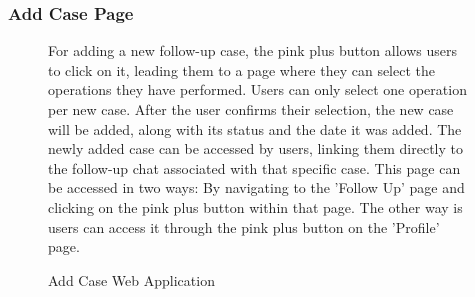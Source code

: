 \documentclass[12pt,oneside,openright,a4paper]{cpe-english-project}
\begin{document}
        \subsubsection{Add Case Page}
          \begin{figure}[!h]
            \centering
            \begin{minipage}{.5\textwidth}
              \centering
            \end{minipage}%
            \begin{minipage}{.5\textwidth}
              \centering
            \end{minipage}%
          
            \caption{Add Case Web Application}\label{fig:WebAppAddCase}
            \begin{flushleft}
              \qquad For adding a new follow-up case, the pink plus button allows users to click on it, leading them to a page where they can select the operations they have performed. Users can only select one operation per new case. After the user confirms their selection, the new case will be added, along with its status and the date it was added. The newly added case can be accessed by users, linking them directly to the follow-up chat associated with that specific case.
              This page can be accessed in two ways: By navigating to the 'Follow Up' page and clicking on the pink plus button within that page. The other way is users can access it through the pink plus button on the 'Profile' page.\par
            \end{flushleft}
          \end{figure}
  
\end{document}
